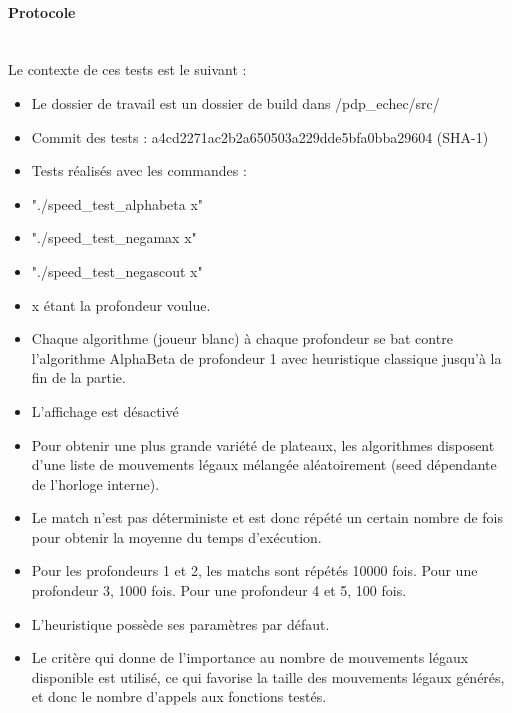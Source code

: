 \huge\documentclass{article}
\begin{document}
    \paragraph{Protocole}
    ~~\\
    \newline
    Le contexte de ces tests est le suivant :
    \begin{itemize}
        \item Le dossier de travail est un dossier de build dans /pdp\_echec/src/
        \item Commit des tests  : a4cd2271ac2b2a650503a229dde5bfa0bba29604 (SHA-1)
        \item Tests réalisés avec les commandes :
        \item "./speed\_test\_alphabeta x"
        \item "./speed\_test\_negamax x"
        \item "./speed\_test\_negascout x"
        \item x étant la profondeur voulue.
        \item Chaque algorithme (joueur blanc) à chaque profondeur se bat contre l'algorithme AlphaBeta de profondeur 1 avec heuristique classique jusqu'à la fin de la partie.
        \item L'affichage est désactivé
        \item Pour obtenir une plus grande variété de plateaux, les algorithmes disposent d'une liste de mouvements légaux mélangée aléatoirement (seed dépendante de l'horloge interne).
        \item Le match n'est pas déterministe et est donc répété un certain nombre de fois pour obtenir la moyenne du temps d'exécution.
        \item Pour les profondeurs 1 et 2, les matchs sont répétés 10000 fois. Pour une profondeur 3, 1000 fois. Pour une profondeur 4 et 5, 100 fois.
        \item L'heuristique possède ses paramètres par défaut.
        \item Le critère qui donne de l'importance au nombre de mouvements légaux disponible est utilisé, ce qui favorise la taille des mouvements légaux générés, et donc le nombre d'appels aux fonctions testés.
    \end{itemize}
\end{document}

